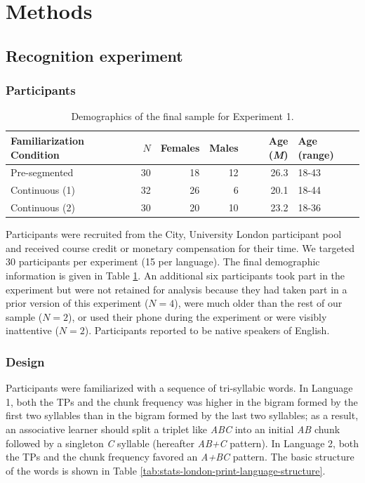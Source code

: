 \documentclass[]{article}
\newcommand{\M}{{\em M\/}}
\newcommand{\myappendix}{%
  \clearpage
   \setcounter{section}{0}
  \renewcommand{\thesection}{SOM\arabic{section}}
  \renewcommand{\thesubsection}{\thesection.\arabic{subsection}}

  \setcounter{figure}{0}
  \setcounter{table}{0} %
  \renewcommand{\thefigure}{S\arabic{figure}}
  \renewcommand{\thetable}{S\arabic{table}}

  \clearpage
  {\noindent {\LARGE {\bf Supplementary Online Materials}}}
}
\newcommand{\appsectionFirst}[1]{
  \section{#1}
  \setcounter{subsection}{0}%
}
\begin{document}
\myappendix

\appsectionFirst{Methods}\label{app:methods}

\subsection{Recognition experiment}\label{recognition-experiment-london}

\subsubsection{Participants}\label{participants-1}

\begin{table}[hbp]

\caption{\label{tab:stats-london-demographics-print}Demographics of the final sample for Experiment 1.}
\centering
\begin{tabular}[t]{lrrrrl}
\toprule
Familiarization Condition & $N$ & Females & Males & Age (\M) & Age (range)\\
\midrule
Pre-segmented & 30 & 18 & 12 & 26.3 & 18-43\\
Continuous (1) & 32 & 26 & 6 & 20.1 & 18-44\\
Continuous (2) & 30 & 20 & 10 & 23.2 & 18-36\\
\bottomrule
\end{tabular}
\end{table}

Participants were recruited from the City, University London participant pool and received course credit or monetary compensation for their time. We targeted 30 participants per experiment (15 per language). The final demographic information is given in Table \ref{tab:stats-london-demographics-print}. An additional six participants took part in the experiment but were not retained for analysis because they had taken part in a prior version of this experiment (\(N = 4\)), were much older than the rest of our sample (\(N = 2\)), or used their phone during the experiment or were visibly inattentive (\(N = 2\)). Participants reported to be native speakers of English.

\subsubsection{Design}

Participants were familiarized with a sequence of tri-syllabic words. In Language 1, both the TPs and the chunk frequency was higher in the bigram formed by the first two syllables than in the bigram formed by the last two syllables; as a result, an associative learner should split a triplet like \emph{ABC} into an initial \emph{AB} chunk followed by a singleton \emph{C} syllable (hereafter \emph{AB+C} pattern). In Language 2, both the TPs and the chunk frequency favored an \emph{A+BC} pattern. The basic structure of the words is shown in Table \ref{tab:stats-london-print-language-structure}.
\end{document}
